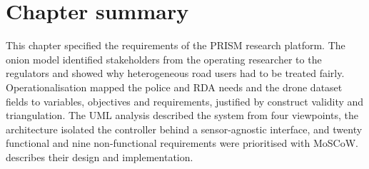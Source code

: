 \section{Chapter summary}\label{sec:srs-summary}

This chapter specified the requirements of the PRISM research platform. The onion model identified stakeholders from the operating researcher to the regulators and showed why heterogeneous road users had to be treated fairly. Operationalisation mapped the police and RDA needs and the drone dataset fields to variables, objectives and requirements, justified by construct validity and triangulation. The UML analysis described the system from four viewpoints, the architecture isolated the controller behind a sensor-agnostic interface, and twenty functional and nine non-functional requirements were prioritised with MoSCoW.  describes their design and implementation.
